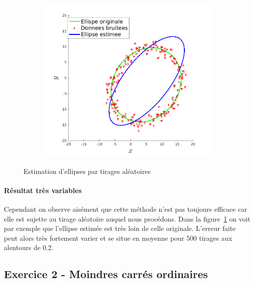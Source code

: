 \documentclass{article}
\begin{document}
\begin{figure}[!ht]
\begin{subfigure}[c]{0.49\linewidth}
        \includegraphics[width=\linewidth]{images/4-hasard_error.png}
        \label{3-tirages-aleatoires-erreur}
    \end{subfigure}
    \caption{Estimation d'ellipses par tirages aléatoires}
    \label{3-tirages-aleatoires}
\end{figure}

\paragraph{Résultat très variables}
Cependant on observe aisément que cette méthode n'est pas toujours efficace car elle est sujette au tirage aléatoire auquel nous procédons. Dans la figure~\ref{3-tirages-aleatoires-erreur} on voit par exemple que l'ellipse estimée est très loin de celle originale. L'erreur faite peut alors très fortement varier et se situe en moyenne pour 500 tirages aux alentours de 0.2.

\subsection{Exercice 2 - Moindres carrés ordinaires}
\end{document}
